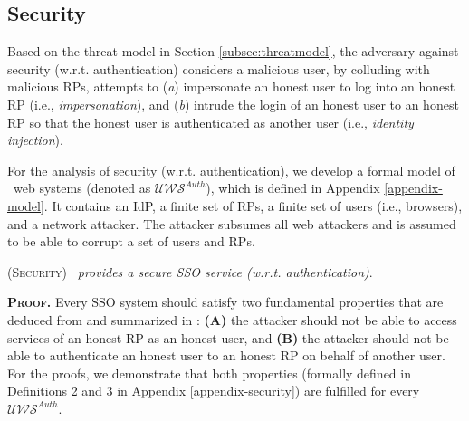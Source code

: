 \subsection{Security}
\label{analysis-security}

\newc
Based on the threat model in Section \ref{subsec:threatmodel}, the adversary against security (w.r.t. authentication) \cite{FettKS14,BrowserID,SPRESSO} considers a malicious user, by colluding with malicious RPs, attempts to (\emph{a}) impersonate an honest user to log into an honest RP (i.e., \emph{impersonation}), and (\emph{b}) intrude the login of an honest user to an honest RP so that the honest user is authenticated as another user (i.e., \emph{identity injection}). 


For the analysis of security (w.r.t. authentication), we develop a formal model of \usso\ web systems (denoted as $\mathcal{U\!W\!S}^{Auth}$), which is defined in Appendix \ref{appendix-model}. It contains an IdP, a finite set of RPs, a finite set of users (i.e., browsers), and a network attacker. The attacker subsumes all web attackers and is assumed to be able to  corrupt a set of users and RPs.


\begin{thm}
\textsc{(Security)} \emph{\usso\ provides a secure SSO service (w.r.t. authentication)}.
\label{thm-security}
\end{thm}

\noindent\textbf{\textsc{Proof.}} Every SSO system should satisfy two fundamental properties that are deduced from \cite{FettKS14} and summarized in \cite{BrowserID,SPRESSO}: {\bf (A)} the attacker should not be able to access services of an honest RP as an honest user, and {\bf (B)} the attacker should not be able to authenticate an honest user to an honest RP on behalf of another user.
For the proofs, we demonstrate that both properties (formally defined in Definitions 2 and 3 in Appendix \ref{appendix-security}) are fulfilled for every $\mathcal{UWS}^{Auth}$.

